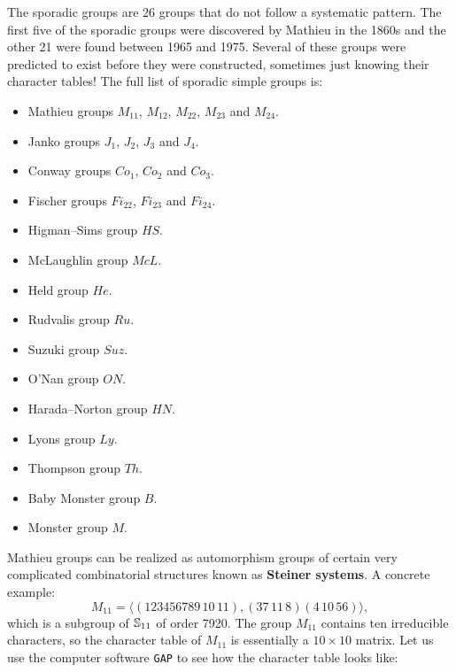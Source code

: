 The sporadic groups are 26 groups that do not follow a systematic pattern. 
The first five of the sporadic groups were discovered by Mathieu in the 1860s and the other 21 
were found between 1965 and 1975.
Several of these groups were predicted to exist before they were constructed, sometimes
just knowing their character tables! 
The full list of sporadic simple groups is:
\begin{itemize}
\item Mathieu groups $M_{11}$, $M_{12}$, $M_{22}$, $M_{23}$ and $M_{24}$.
\item Janko groups $J_1$, $J_2$, $J_3$ and $J_4$.
\item Conway groups $Co_1$, $Co_2$ and $Co_3$.
\item Fischer groups $Fi_{22}$, $Fi_{23}$ and $Fi_{24}$. 
\item Higman–Sims group $HS$.
\item McLaughlin group $McL$.
\item Held group $He$.
\item Rudvalis group $Ru$.
\item Suzuki group $Suz$.
\item O'Nan group $ON$.
\item Harada–Norton group $HN$.
\item Lyons group $Ly$.
\item Thompson group $Th$.
\item Baby Monster group $B$.
\item Monster group $M$.
\end{itemize}

Mathieu groups can be realized 
as automorphism groups of certain very complicated
combinatorial structures known as \textbf{Steiner systems}. 
A concrete example: 
\[
M_{11}=\langle (123456789\,10\,11), (37\,11\,8)(4\,10\,56)\rangle,
\]
which is a subgroup of $\mathbb{S}_{11}$ of order 7920. The group
$M_{11}$ contains ten irreducible characters, so the
character table of $M_{11}$ is essentially a $10\times 10$ matrix. Let us
use the computer software \lstinline{GAP} 
to see how the character table looks like:

